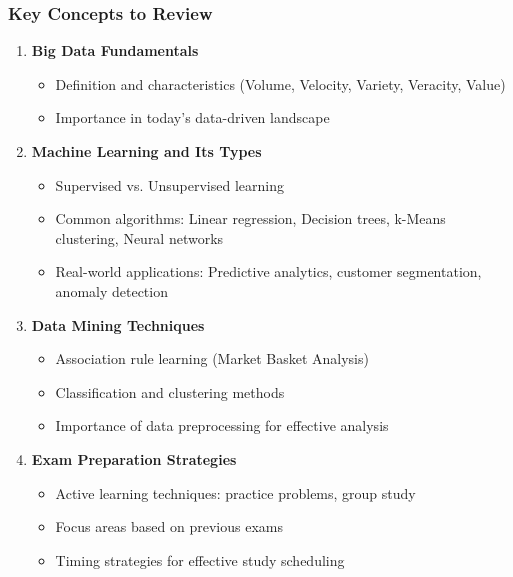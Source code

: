 \documentclass[aspectratio=169]{beamer}
\begin{document}
\begin{frame}[fragile]
    \frametitle{Key Concepts to Review}
    \begin{enumerate}
        \item \textbf{Big Data Fundamentals}
            \begin{itemize}
                \item Definition and characteristics (Volume, Velocity, Variety, Veracity, Value)
                \item Importance in today's data-driven landscape
            \end{itemize}
        \item \textbf{Machine Learning and Its Types}
            \begin{itemize}
                \item Supervised vs. Unsupervised learning
                \item Common algorithms: Linear regression, Decision trees, k-Means clustering, Neural networks
                \item Real-world applications: Predictive analytics, customer segmentation, anomaly detection
            \end{itemize}
        \item \textbf{Data Mining Techniques}
            \begin{itemize}
                \item Association rule learning (Market Basket Analysis)
                \item Classification and clustering methods
                \item Importance of data preprocessing for effective analysis
            \end{itemize}
        \item \textbf{Exam Preparation Strategies}
            \begin{itemize}
                \item Active learning techniques: practice problems, group study
                \item Focus areas based on previous exams
                \item Timing strategies for effective study scheduling
            \end{itemize}
    \end{enumerate}
\end{frame}
\end{document}
